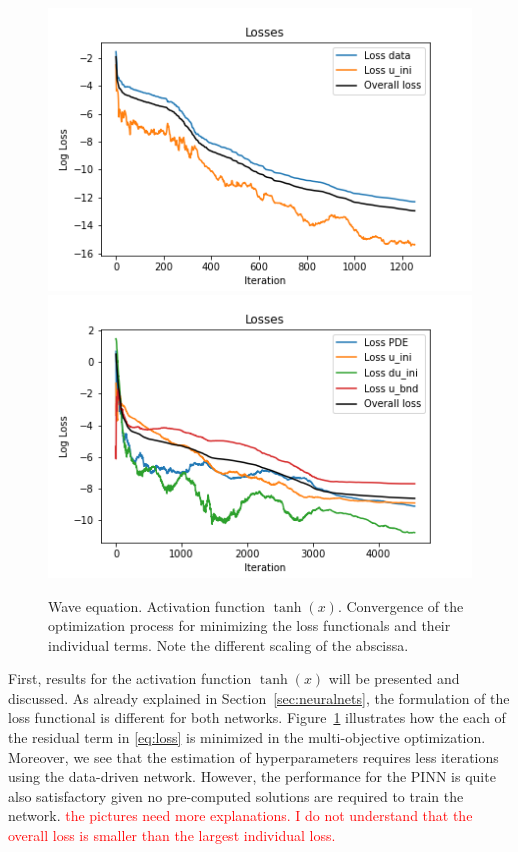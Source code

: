 \begin{figure}[t!]
\begin{center}
\includegraphics[width=0.45\linewidth]{../Code/B1/losses/combined_losses_reduction_data.png}
\includegraphics[width=0.45\linewidth]{../Code/B1/losses//combined_losses_reduction_PINNs.png}
\end{center}
\caption{Wave equation. Activation function $\tanh(x)$. Convergence of the optimization process 
for minimizing the loss functionals and their individual terms. Note the different scaling of the 
abscissa.}\label{fig:wave_loss_contributions}
\end{figure}

First, results for the activation function $\tanh(x)$ will be presented and discussed. 
As already explained in Section~\ref{sec:neuralnets}, the formulation of the loss functional is 
different for both networks. Figure~\ref{fig:wave_loss_contributions} illustrates how the each of the 
residual term in \eqref{eq:loss} is minimized in the multi-objective optimization. Moreover, we see 
that the estimation of hyperparameters requires less iterations using 
the data-driven network. However, the performance for the PINN is quite also satisfactory given 
no pre-computed solutions are required to train the network.   
\textcolor{red}{the pictures need more explanations. I do not understand that the overall loss 
is smaller than the largest individual loss.}

